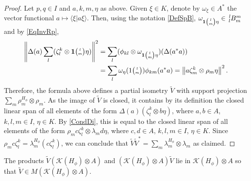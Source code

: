  \begin{proof}
   Let $p,q\in I$ and $a,k,m,\eta$ as above. Given $\xi \in K$, denote by $\omega_{\xi}\in A^{*}$ the vector
   functional $a \mapsto \langle \xi|a\xi\rangle$.%
   Then, using the notation \eqref{DefSpB}, $\omega_{\UnitC{l}{m}\eta} \in \Gr{B}{l}{m}{l}{m}$ and by \eqref{EqInvRp},
   \begin{align*}
  \left\|\Delta(a)\sum_{l}(\zeta^{k}_{l}\otimes \mathbf{1}{\tiny {\begin{pmatrix} l\\m\end{pmatrix}}}\eta)\right\|^{2} &= \sum_{l} (\phi_{kl}
  \otimes \omega_{\mathbf{1}{\tiny {\begin{pmatrix} l\\m\end{pmatrix}}}\eta})(\Delta(a^{*}a)) \\
  &= \sum_{l}\omega_{\eta}(1{\tiny \begin{pmatrix} l \\ m\end{pmatrix}}) \phi_{km}(a^{*}a) 
  = \left\|a\zeta^{k}_{m} \otimes  \rho_{m}\eta \right\|^{2}.
\end{align*}
Therefore, the formula above defines a partial isometry $\tilde V$ with support projection $\sum_{m}
\rho^{H_{\phi}}_{m} \otimes \rho_{m}$. %
As the image of $\tilde V$ is closed, it contains by its definition the closed linear span of all elements of the form
$\Delta(a) (\zeta^{k}_{l} \otimes b\eta)$, where $a,b\in A$, $k,l,m\in I$, $\eta\in K$. By  \eqref{CondDi}, this is equal to the closed linear span of all
elements of the form $\rho_{m}c \zeta^{k}_{l} \otimes \lambda_{m}d\eta$,
where $c,d\in A$, $k,l,m \in I$, $\eta\in K$. Since $\rho_{m}c\zeta^{k}_{l} =%
\lambda^{H_{\phi}}_{m}(c\zeta^{k}_{l})$, we can conclude that $\tilde V \tilde V^{*}=\sum_{m} \lambda^{H_{\phi}}_{m}
\otimes \lambda_{m}$ as claimed.
 \end{proof}
 \begin{Lem}\label{lem:reg-corep-mult}
   The products $ \tilde V(\mathcal{K}(H_{\phi})\otimes A)$ and 
   $(\mathcal{K}(H_{\phi}) \otimes A)\tilde V$ lie in %
  $\mathcal{K}(H_{\phi})\otimes A$ so that $\tilde V \in M(\mathcal{K}(H_{\phi})\otimes A)$.
 \end{Lem}
